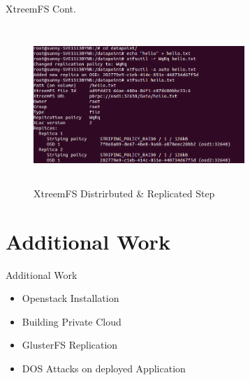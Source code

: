 \documentclass[10pt,xcolor=dvipsnames]{beamer}
\begin{document}
\begin{frame}{XtreemFS Cont.}

\begin{figure}[H]
\begin{center}
\includegraphics[width=8cm,height=6cm]{OSD1.png}
\caption{XtreemFS Distrirbuted \& Replicated Step}
\end{center}
\end{figure}

\end{frame}

\section{Additional Work}
\begin{frame}{Additional Work}
\begin{itemize}
\item Openstack Installation
\item Building Private Cloud
\item GlusterFS Replication
\item DOS Attacks on deployed Application
\end{itemize}
\end{frame}
\end{document}
